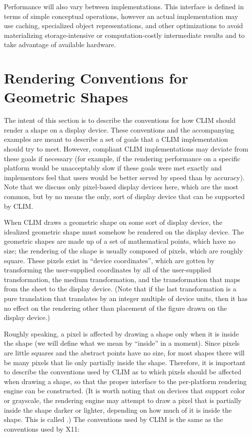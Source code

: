 Performance will also vary between implementations.  This interface is defined
in terms of simple conceptual operations, however an actual implementation may
use caching, specialized object representations, and other optimizations to
avoid materializing storage-intensive or computation-costly intermediate results
and to take advantage of available hardware.


\section {Rendering Conventions for Geometric Shapes}

The intent of this section is to describe the conventions for how CLIM should
render a shape on a display device.  These conventions and the accompanying
examples are meant to describe a set of goals that a CLIM implementation should
try to meet.  However, compliant CLIM implementations may deviate from these
goals if necessary (for example, if the rendering performance on a specific
platform would be unacceptably slow if these goals were met exactly and
implementors feel that users would be better served by speed than by accuracy).
Note that we discuss only pixel-based display devices here, which are the most
common, but by no means the only, sort of display device that can be supported
by CLIM.

When CLIM draws a geometric shape on some sort of display device, the idealized
geometric shape must somehow be rendered on the display device.  The geometric
shapes are made up of a set of mathematical points, which have no size; the
rendering of the shape is usually composed of pixels, which are roughly square.
These pixels exist in ``device coordinates'', which are gotten by transforming
the user-supplied coordinates by all of the user-supplied transformation, the
medium transformation, and the transformation that maps from the sheet to the
display device.  (Note that if the last transformation is a pure translation
that translates by an integer multiple of device units, then it has no effect on
the rendering other than placement of the figure drawn on the display device.)

Roughly speaking, a pixel is affected by drawing a shape only when it is inside
the shape (we will define what we mean by ``inside'' in a moment).  Since pixels
are little squares and the abstract points have no size, for most shapes there
will be many pixels that lie only partially inside the shape.  Therefore, it is
important to describe the conventions used by CLIM as to which pixels should be
affected when drawing a shape, so that the proper interface to the per-platform
rendering engine can be constructed.  (It is worth noting that on devices that
support color or grayscale, the rendering engine may attempt to draw a pixel
that is partially inside the shape darker or lighter, depending on how much of
it is inside the shape.  This is called .)  The conventions
used by CLIM is the same as the conventions used by X11:

